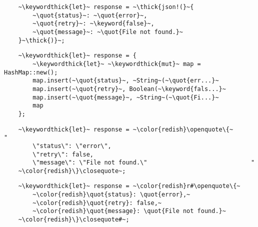 \documentclass[usepdftitle=false]{beamer}
\newcommand{\thick}[1]{\contourlength{0.16pt}\contour[10]{black}{#1}}
\newcommand{\slantbox}[2][.5]
  {%
    \mbox
      {%
        \sbox{\foobox}{#2}%
        \hskip\wd\foobox
        \pdfsave
        \pdfsetmatrix{1 0 #1 1}%
        \llap{\usebox{\foobox}}%
        \pdfrestore
      }%
  }
\newcommand{\backslantbox}[2][.5]
  {%
    \mbox
      {%
        \sbox{\foobox}{#2}%
        \hskip\wd\foobox
        \pdfsave
        \pdfsetmatrix{-1 0 #1 1}%
        \llap{\usebox{\foobox}}%
        \pdfrestore
      }%
  }
\newcommand{\openquote}{\backslantbox[.2]{\hspace{11pt}''\hspace{-11pt}}}
\newcommand{\closequote}{\slantbox[-.2]{\hspace{2pt}''\hspace{-2pt}}}
\newcommand{\blackquote}[1]{\openquote#1\closequote}
\newcommand{\quot}[1]{{\color{redish}\blackquote{#1}}}
\newcommand{\keyword}[1]{\color{greenish}#1}
\newcommand{\keywordthick}[1]{\color{greenish}\contourlength{0.20pt}\contour[10]{greenish}{#1}}
\begin{document}
\begin{frame}[fragile]
  \begin{verbatim}
    ~\keywordthick{let}~ response = ~\thick{json!(}~{
        ~\quot{status}~: ~\quot{error}~,
        ~\quot{retry}~: ~\keyword{false}~,
        ~\quot{message}~: ~\quot{File not found.}~
    }~\thick{)}~;
  \end{verbatim}
\end{frame}

\begin{frame}[fragile]
  \begin{verbatim}
    ~\keywordthick{let}~ response = {
        ~\keywordthick{let}~ ~\keywordthick{mut}~ map = HashMap::new();
        map.insert(~\quot{status}~, ~String~(~\quot{err...}~
        map.insert(~\quot{retry}~, Boolean(~\keyword{fals...}~
        map.insert(~\quot{message}~, ~String~(~\quot{Fi...}~
        map
    };
  \end{verbatim}
\end{frame}

\begin{frame}[fragile]
  \begin{verbatim}
    ~\keywordthick{let}~ response = ~\color{redish}\openquote\{~                      "
        \"status\": \"error\",
        \"retry\": false,
        \"message\": \"File not found.\"                             "
    ~\color{redish}\}\closequote~;
  \end{verbatim}
\end{frame}

\begin{frame}[fragile]
  \begin{verbatim}
    ~\keywordthick{let}~ response = ~\color{redish}r#\openquote\{~
        ~\color{redish}\quot{status}: \quot{error},~
        ~\color{redish}\quot{retry}: false,~
        ~\color{redish}\quot{message}: \quot{File not found.}~
    ~\color{redish}\}\closequote#~;
  \end{verbatim}
\end{frame}
\end{document}
